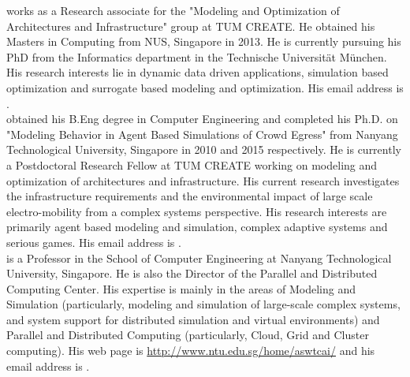 \documentclass{wscpaperproc}
\theoremstyle{wsc}
\begin{document}
 works as a Research associate for the "Modeling and Optimization of Architectures and Infrastructure" group at TUM CREATE. He obtained his Masters in Computing from NUS, Singapore in 2013. He is currently pursuing his PhD from the Informatics department in the Technische Universit\"at M\"unchen. His research interests lie in dynamic data driven applications, simulation based optimization and surrogate based modeling and optimization. His email address is .\\

 obtained his B.Eng degree in Computer Engineering and completed his Ph.D. on "Modeling Behavior in Agent Based Simulations of Crowd Egress" from Nanyang Technological University, Singapore in 2010 and 2015 respectively. He is currently a Postdoctoral Research Fellow at TUM CREATE working on modeling and optimization of architectures and infrastructure. His current research investigates the infrastructure requirements and the environmental impact of large scale electro-mobility from a complex systems perspective. His research interests are primarily agent based modeling and simulation, complex adaptive systems and serious games. His email address is .\\

 is a Professor in the School of Computer Engineering at Nanyang Technological University, Singapore. He is also the Director of the Parallel and Distributed Computing Center. His expertise is mainly in the areas of Modeling and Simulation (particularly, modeling and simulation of large-scale complex systems, and system support for distributed simulation and virtual environments) and Parallel and Distributed Computing (particularly, Cloud, Grid and Cluster computing). His web page is \hyperref{http://www.ntu.edu.sg/home/aswtcai/}{}{}{http://www.ntu.edu.sg/home/aswtcai/} and his email address is .\\
\end{document}
